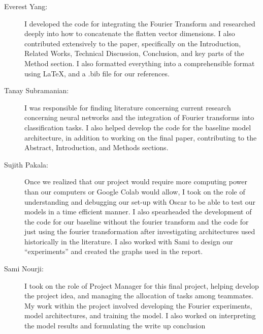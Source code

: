 \begin{description}

\item[Everest Yang:] I developed the code for integrating the Fourier Transform and researched deeply into how to concatenate the flatten vector dimensions. I also contributed extensively to the paper, specifically on the Introduction, Related Works, Technical Discussion, Conclusion, and key parts of the Method section. I also formatted everything into a comprehensible format using LaTeX, and a .bib file for our references.

\item[Tanay Subramanian:] I was responsible for finding literature concerning current research concerning neural networks and the integration of Fourier transforms into classification tasks. I also helped develop the code for the baseline model architecture, in addition to working on the final paper, contributing to the Abstract, Introduction, and Methods sections.

\item[Sujith Pakala:] Once we realized that our project would require more computing power than our computers or Google Colab would allow, I took on the role of understanding and debugging our set-up with Oscar to be able to test our models in a time efficient manner. I also spearheaded the development of the code for our baseline without the fourier transform and the code for just using the fourier transformation after investigating architectures used historically in the literature. I also worked with Sami to design our “experiments” and created the graphs used in the report. 

\item[Sami Nourji:] I took on the role of Project Manager for this final project, helping develop the project idea, and managing the allocation of tasks among teammates. My work within the project involved developing the Fourier experiments, model architectures, and training the model. I also worked on interpreting the model results and formulating the write up conclusion



\end{description}


